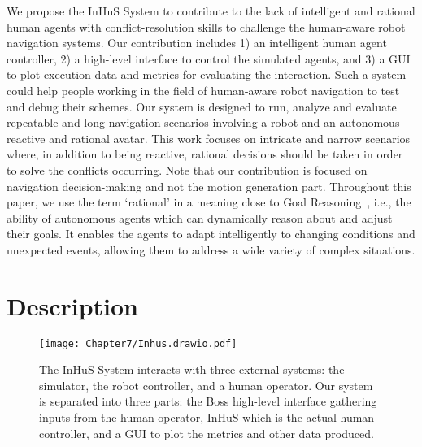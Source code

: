We propose the InHuS System to contribute to the lack of intelligent and rational human agents with conflict-resolution skills to challenge the human-aware robot navigation systems. Our contribution includes 1) an intelligent human agent controller, 2) a high-level interface to control the simulated agents, and 3) a GUI to plot execution data and metrics for evaluating the interaction. Such a system could help people working in the field of human-aware robot navigation to test and debug their schemes. Our system is designed to run, analyze and evaluate repeatable and long navigation scenarios involving a robot and an autonomous reactive and rational avatar. This work focuses on intricate and narrow scenarios where, in addition to being reactive, rational decisions should be taken in order to solve the conflicts occurring. Note that our contribution is focused on navigation decision-making and not the motion generation part. Throughout this paper, we use the term `rational' in a meaning close to Goal Reasoning~\cite{vattam_breadth_nodate,abbass_goal_2018}, i.e., the ability of autonomous agents which can dynamically reason about and adjust their goals. It enables the agents to adapt intelligently to changing conditions and unexpected events, allowing them to address a wide variety of complex situations.









\section{Description}
 
\begin{figure}[ht]
    \centering
    \texttt{[image: Chapter7/Inhus.drawio.pdf]}
    \caption{
    The InHuS System interacts with three external systems: the simulator, the robot controller, and a human operator. Our system is separated into three parts: the Boss high-level interface gathering inputs from the human operator, InHuS which is the actual human controller, and a GUI to plot the metrics and other data produced.
    }
    \label{fig:overview_inhus}
    \vspace{-0.8cm}
\end{figure}

